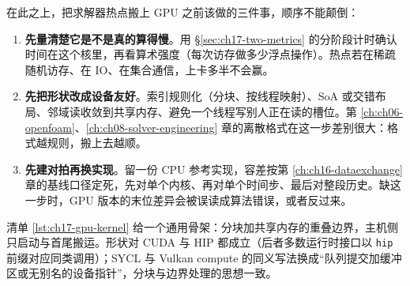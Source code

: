 \documentclass[12pt,a4paper,fontset=fandol]{ctexbook}
\newcommand{\Tp}[1]{\texttt{#1}}
\newcommand{\Lang}[1]{\textsf{#1}}
\begin{document}
在此之上，把求解器热点搬上 GPU 之前该做的三件事，顺序不能颠倒：

\begin{enumerate}
\item \textbf{先量清楚它是不是真的算得慢}。用 \S\ref{sec:ch17-two-metrics} 的分阶段计时确认时间在这个核里，再看算术强度（每次访存做多少浮点操作）。热点若在稀疏随机访存、在 IO、在集合通信，上卡多半不会赢。
\item \textbf{先把形状改成设备友好}。索引规则化（分块、按线程映射）、SoA 或交错布局、邻域读收敛到共享内存、避免一个线程写别人正在读的槽位。第 \ref{ch:ch06-openfoam}、\ref{ch:ch08-solver-engineering} 章的离散格式在这一步差别很大：格式越规则，搬上去越顺。
\item \textbf{先建对拍再换实现}。留一份 CPU 参考实现，容差按第 \ref{ch:ch16-dataexchange} 章的基线口径定死，先对单个内核、再对单个时间步、最后对整段历史。缺这一步时，GPU 版本的末位差异会被误读成算法错误，或者反过来。
\end{enumerate}

清单 \ref{lst:ch17-gpu-kernel} 给一个通用骨架：分块加共享内存的重叠边界，主机侧只启动与首尾搬运。形状对 \Lang{CUDA} 与 \Lang{HIP} 都成立（后者多数运行时接口以 \Tp{hip} 前缀对应同类调用）；\Lang{SYCL} 与 \Lang{Vulkan compute} 的同义写法换成``队列提交加缓冲区或无别名的设备指针''，分块与边界处理的思想一致。
\end{document}
